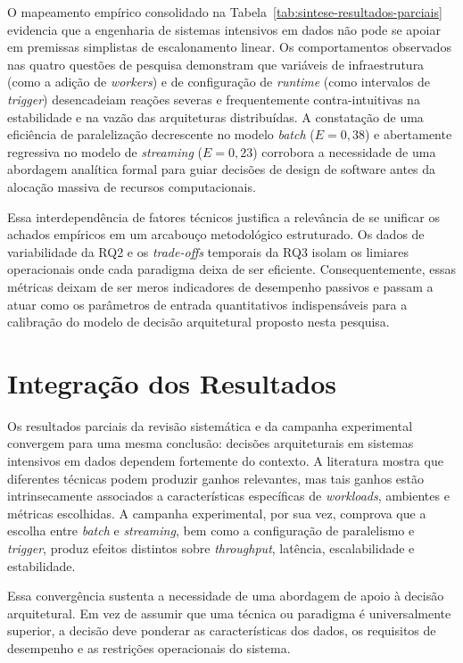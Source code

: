 O mapeamento empírico consolidado na Tabela~\ref{tab:sintese-resultados-parciais} evidencia que a engenharia de sistemas intensivos em dados não pode se apoiar em premissas simplistas de escalonamento linear. Os comportamentos observados nas quatro questões de pesquisa demonstram que variáveis de infraestrutura (como a adição de \textit{workers}) e de configuração de \textit{runtime} (como intervalos de \textit{trigger}) desencadeiam reações severas e frequentemente contra-intuitivas na estabilidade e na vazão das arquiteturas distribuídas. A constatação de uma eficiência de paralelização decrescente no modelo \textit{batch} ($E = 0{,}38$) e abertamente regressiva no modelo de \textit{streaming} ($E = 0{,}23$) corrobora a necessidade de uma abordagem analítica formal para guiar decisões de design de software antes da alocação massiva de recursos computacionais.

Essa interdependência de fatores técnicos justifica a relevância de se unificar os achados empíricos em um arcabouço metodológico estruturado. Os dados de variabilidade da RQ2 e os \textit{trade-offs} temporais da RQ3 isolam os limiares operacionais onde cada paradigma deixa de ser eficiente. Consequentemente, essas métricas deixam de ser meros indicadores de desempenho passivos e passam a atuar como os parâmetros de entrada quantitativos indispensáveis para a calibração do modelo de decisão arquitetural proposto nesta pesquisa.


\section{Integração dos Resultados}
\label{sec:integracao-resultados}

Os resultados parciais da revisão sistemática e da campanha experimental convergem para uma mesma conclusão: decisões arquiteturais em sistemas intensivos em dados dependem fortemente do contexto. A literatura mostra que diferentes técnicas podem produzir ganhos relevantes, mas tais ganhos estão intrinsecamente associados a características específicas de \textit{workloads}, ambientes e métricas escolhidas. A campanha experimental, por sua vez, comprova que a escolha entre \textit{batch} e \textit{streaming}, bem como a configuração de paralelismo e \textit{trigger}, produz efeitos distintos sobre \textit{throughput}, latência, escalabilidade e estabilidade.

Essa convergência sustenta a necessidade de uma abordagem de apoio à decisão arquitetural. Em vez de assumir que uma técnica ou paradigma é universalmente superior, a decisão deve ponderar as características dos dados, os requisitos de desempenho e as restrições operacionais do sistema.

